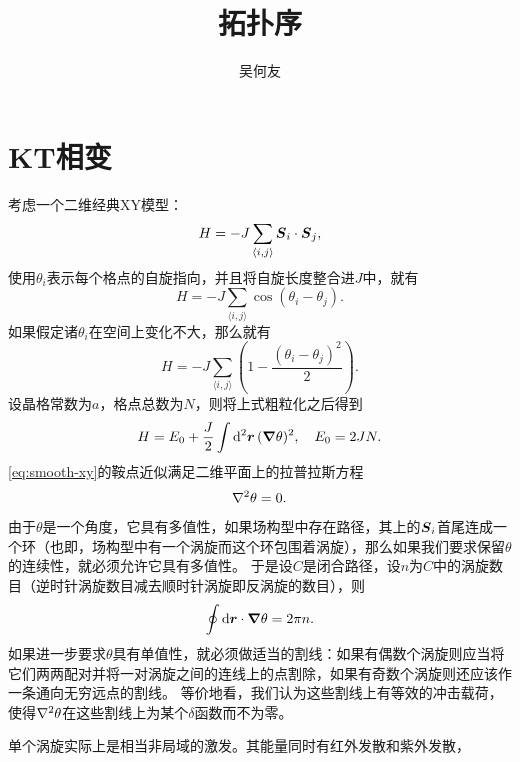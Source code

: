 \documentclass[hyperref, UTF8, a4paper]{ctexart}
\title{拓扑序}
\author{吴何友}
\newcommand*{\pair}[1]{\langle #1 \rangle}
\begin{document}
\maketitle

\section{KT相变}

考虑一个二维经典XY模型：
\begin{equation}
    H = - J \sum_{\pair{i, j}} \vb*{S}_i \cdot \vb*{S}_j,
\end{equation}
使用$\theta_i$表示每个格点的自旋指向，并且将自旋长度整合进$J$中，就有
\begin{equation}
    H = - J \sum_{\pair{i, j}} \cos(\theta_i - \theta_j).
\end{equation}
如果假定诸$\theta_i$在空间上变化不大，那么就有
\[
    H = - J \sum_{\pair{i, j}} \left( 1 - \frac{(\theta_i - \theta_j)^2}{2} \right).
\]
设晶格常数为$a$，格点总数为$N$，则将上式粗粒化之后得到
\begin{equation}
    H = E_0 + \frac{J}{2} \int \dd[2]{\vb*{r}} (\grad{\theta})^2, \quad E_0 = 2 J N.
    \label{eq:smooth-xy}
\end{equation}
\eqref{eq:smooth-xy}的鞍点近似满足二维平面上的拉普拉斯方程
\begin{equation}
    \laplacian{\theta} = 0.
\end{equation}

由于$\theta$是一个角度，它具有多值性，如果场构型中存在路径，其上的$\vb*{S}_i$首尾连成一个环（也即，场构型中有一个涡旋而这个环包围着涡旋），那么如果我们要求保留$\theta$的连续性，就必须允许它具有多值性。
于是设$C$是闭合路径，设$n$为$C$中的涡旋数目（逆时针涡旋数目减去顺时针涡旋即反涡旋的数目），则
\begin{equation}
    \oint \dd{\vb*{r}} \cdot \grad{\theta} = 2 \pi n.
\end{equation}
如果进一步要求$\theta$具有单值性，就必须做适当的割线：如果有偶数个涡旋则应当将它们两两配对并将一对涡旋之间的连线上的点割除，如果有奇数个涡旋则还应该作一条通向无穷远点的割线。
等价地看，我们认为这些割线上有等效的冲击载荷，使得$\laplacian{\theta}$在这些割线上为某个$\delta$函数而不为零。

单个涡旋实际上是相当非局域的激发。其能量同时有红外发散和紫外发散，
\end{document}
